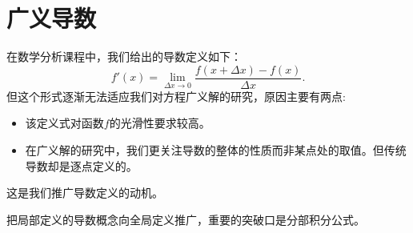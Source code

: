 \section{广义导数}
在数学分析课程中，我们给出的导数定义如下：
\begin{equation}
    \label{eq:traditionaldir}
    f'(x)=\lim_{\Delta x\rightarrow 0}\frac{f(x+\Delta x)-f(x)}{\Delta x}.
\end{equation}
但这个形式逐渐无法适应我们对方程广义解的研究，原因主要有两点:
\begin{itemize}
    \item 该定义式对函数$f$的光滑性要求较高。
    \item 在广义解的研究中，我们更关注导数的整体的性质而非某点处的取值。但传统导数却是逐点定义的。
\end{itemize}
这是我们推广导数定义的动机。

把局部定义的导数概念向全局定义推广，重要的突破口是分部积分公式。

